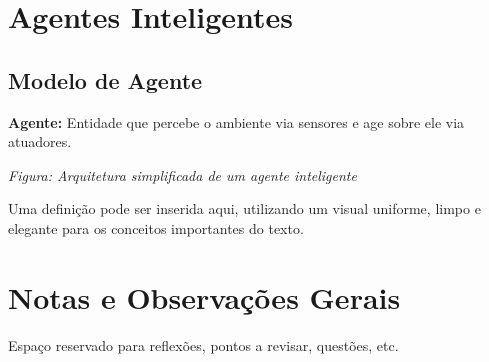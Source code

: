 \section{Agentes Inteligentes}

\subsection{Modelo de Agente}
\begin{conceptbox}
\textbf{Agente:} Entidade que percebe o ambiente via sensores e age sobre ele via atuadores.
\end{conceptbox}

\begin{diagrambox}
\textit{Figura: Arquitetura simplificada de um agente inteligente}
\end{diagrambox}

\begin{definitionbox}
Uma definição pode ser inserida aqui, utilizando um visual uniforme, limpo e elegante para os conceitos importantes do texto.
\end{definitionbox}

\section{Notas e Observações Gerais}
Espaço reservado para reflexões, pontos a revisar, questões, etc.
